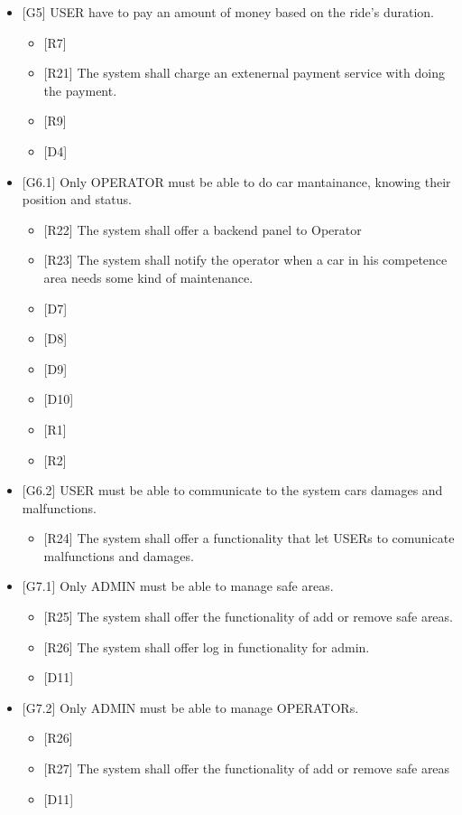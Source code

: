 \begin{itemize}
\item {[}G5{]} USER have to pay an amount of money based on the ride's duration.
\begin{itemize}
\item {[}R7{]} 
\item {[}R21{]} The system shall charge an extenernal payment service with
doing the payment.
\item {[}R9{]}
\item {[}D4{]} 
\end{itemize}
\item {[}G6.1{]} Only OPERATOR must be able to do car mantainance, knowing
their position and status.
\begin{itemize}
\item {[}R22{]} The system shall offer a backend panel to Operator
\item {[}R23{]} The system shall notify the operator when a car in his competence
area needs some kind of maintenance.
\item {[}D7{]} 
\item {[}D8{]}
\item {[}D9{]}
\item {[}D10{]}
\item {[}R1{]}
\item {[}R2{]}
\end{itemize}
\item {[}G6.2{]} USER must be able to communicate to the system cars damages
and malfunctions. 
\begin{itemize}
\item {[}R24{]} The system shall offer a functionality that let USERs to
comunicate malfunctions and damages.
\end{itemize}
\item {[}G7.1{]} Only ADMIN must be able to manage safe areas.
\begin{itemize}
\item {[}R25{]} The system shall offer the functionality of add or remove
safe areas.
\item {[}R26{]} The system shall offer log in functionality for admin.
\item {[}D11{]}
\end{itemize}
\item {[}G7.2{]} Only ADMIN must be able to manage OPERATORs.
\begin{itemize}
\item {[}R26{]}
\item {[}R27{]} The system shall offer the functionality of add or remove
safe areas
\item {[}D11{]}
\end{itemize}
\end{itemize}

